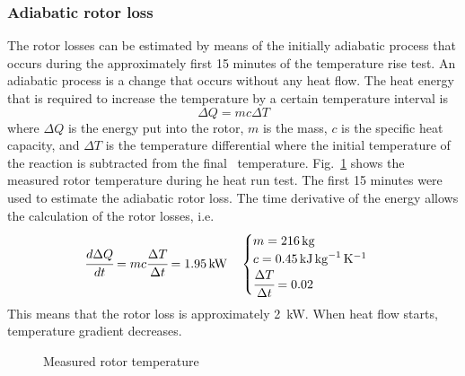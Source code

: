 \subsubsection{Adiabatic rotor loss}
The rotor losses can be estimated by means of the initially adiabatic process that occurs during the approximately first 15 minutes of the temperature rise test. An adiabatic process is a change that occurs without any heat flow. The heat energy that is required to increase the temperature by a certain temperature interval is
\begin{equation}
 \Delta Q = m c \Delta T
\end{equation}
where $\Delta Q$ is the energy put into the rotor, $m$ is the mass, $c$ is the specific heat capacity, and $\Delta T$ is the temperature differential where the initial temperature of the reaction is subtracted from the final~%
temperature. Fig.~\ref{fig:measured_rot_temp} shows the measured rotor temperature during he heat run test. The first 15 minutes were used to estimate the adiabatic rotor loss. The time derivative of the energy allows the calculation of the rotor losses, i.e.
\begin{equation}
 \label{eqn:adibatic}
 \cfrac{d\Delta Q}{dt} = m c \cfrac{\Delta T}{\Delta t}=\SI{1.95}{kW}
 \quad
 \begin{cases}
 m = \SI{216}{kg} \\
 c = \SI{0.45}{kJ.kg^{-1}.K^{-1}} \\
 \cfrac{\Delta T}{\Delta t} = 0.02
 \end{cases}
\end{equation}
This means that the rotor loss is approximately \SI{2}{kW}. When heat flow starts, temperature gradient decreases.
\begin{figure}[htbp]
	\centering
		
	\caption{Measured rotor temperature}
	\label{fig:measured_rot_temp}
\end{figure}

